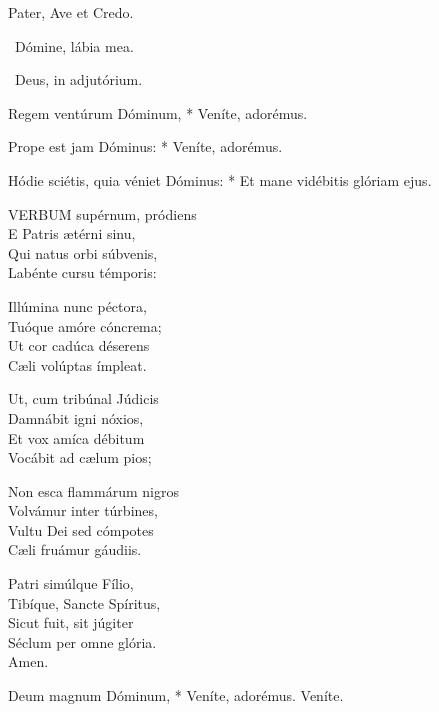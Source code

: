 

Pater, Ave et Credo.

\V\ Dómine, lábia mea.

\V\ Deus, in adjutórium.



 Regem ventúrum Dóminum, * Veníte, adorémus.


 Prope est jam Dóminus: * Veníte, adorémus.


 Hódie sciétis, quia véniet Dóminus: * Et mane vidébitis glóriam ejus.


\lettrine[lines=2]{V}{ERBUM} supérnum, pródiens\\
E Patris ætérni sinu,\\
Qui natus orbi súbvenis,\\
Labénte cursu témporis:

Illúmina nunc péctora,\\
Tuóque amóre cóncrema;\\
Ut cor cadúca déserens\\
Cæli volúptas ímpleat.

Ut, cum tribúnal Júdicis\\
Damnábit igni nóxios,\\
Et vox amíca débitum\\
Vocábit ad cælum pios;

Non esca flammárum nigros\\
Volvámur inter túrbines,\\
Vultu Dei sed cómpotes\\
Cæli fruámur gáudiis.

Patri simúlque Fílio,\\
Tibíque, Sancte Spíritus,\\
Sicut fuit, sit júgiter\\
Séclum per omne glória.\\
Amen.


 Deum magnum Dóminum, * Veníte, adorémus.  Veníte.

